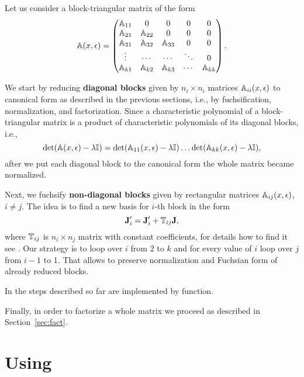 \documentclass[12pt,a4paper]{article}
\begin{document}
Let us consider a block-triangular matrix of the form
\begin{equation}
\label{eq:bdiag}
\mathbb{A}(x,\epsilon)=
\left(
\begin{matrix}
  \mathbb{A}_{11} & 0      & 0 & 0 & 0
\\
  \mathbb{A}_{21} & \mathbb{A}_{22} & 0 & 0 & 0
\\
  \mathbb{A}_{31} & \mathbb{A}_{32} & \mathbb{A}_{33} & 0 & 0
\\
  \vdots & \cdots & \cdots & \ddots & 0
\\
  \mathbb{A}_{k1} & \mathbb{A}_{k2} & \mathbb{A}_{k3} & \cdots & \mathbb{A}_{kk}
\end{matrix}
\right)
.
\end{equation}

We start by reducing {\bf diagonal blocks} given by $n_i \times n_i$ matrices $\mathbb{A}_{ii}(x,\epsilon)$ to canonical form as described in the previous sections, i.e., by fuchsification, normalization, and factorization.
Since a characteristic polynomial of a block-triangular matrix is a product of characteristic polynomials of its diagonal blocks, i.e.,
\begin{equation}
  \det(\mathbb{A}(x,\epsilon)-\lambda \mathbb{I}) = \det(\mathbb{A}_{11}(x,\epsilon) - \lambda\mathbb{I}) \ldots  \det(\mathbb{A}_{kk}(x,\epsilon) - \lambda \mathbb{I})
  ,
\end{equation}
after we put each diagonal block to the canonical form the whole matrix became normalized.

Next, we fuchsify {\bf non-diagonal blocks} given by rectangular matrices $\mathbb{A}_{ij}(x,\epsilon)$, $i \ne j$.
The idea is to find a new basis for $i$-th block in the form
\begin{equation}
  \mathbf{J}'_i = \mathbf{J}'_i + \mathbb{T}_{ij} \mathbf{J},
\end{equation}
where $\mathbb{T}_{ij}$ is $n_i \times n_j$ matrix with constant coefficients, for details how to find it see \cite[Section 7]{Lee15}.
Our strategy is to loop over $i$ from 2 to $k$ and for every value of $i$ loop over $j$ from $i-1$ to 1.
That allows to preserve normalization and Fuchsian form of already reduced blocks.

In \fuchsia the steps described so far are implemented by  function.

Finally, in order to factorize a whole matrix we proceed as described in Section~\ref{sec:fact}.


\section{Using \fuchsia}
\label{sec:3}
\end{document}
